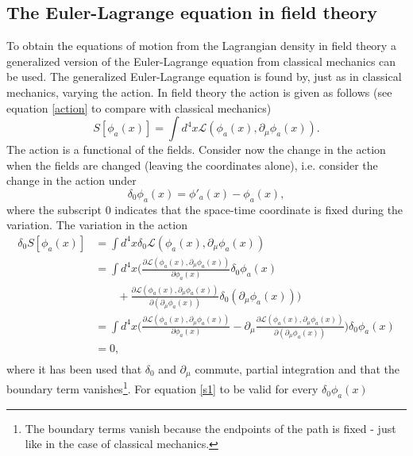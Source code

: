\subsection{The Euler-Lagrange equation in field theory}
To obtain the equations of motion from the Lagrangian density in field theory a generalized version of the Euler-Lagrange equation from classical mechanics can be used. The generalized Euler-Lagrange equation is found by, just as in classical mechanics, varying the action. In field theory the action is given as follows (see equation \eqref{action} to compare with classical mechanics) 
\begin{equation}
	S[\phi_a(x)]=\int d^4x\mathcal{L}(\phi_a(x),\partial_\mu\phi_a(x)).
\end{equation} 
The action is a functional of the fields. Consider now the change in the action when the fields are changed (leaving the coordinates alone), i.e. consider the change in the action under
\begin{equation}
	\delta_0 \phi_a(x)=\phi'_a(x)-\phi_a(x),
\end{equation} 
where the subscript $0$ indicates that the space-time coordinate is fixed during the variation. The variation in the action
\begin{equation}
	\begin{split}
		\delta_0 S[\phi_a(x)]&=\int d^4x\delta_0\mathcal{L}(\phi_a(x),\partial_\mu\phi_a(x))\\
		&=\int d^4x\bigg(\frac{\partial \mathcal{L}(\phi_a(x),\partial_\mu\phi_a(x))}{\partial \phi_a(x)}\delta_0 \phi_a(x)\\
		& \qquad+\frac{\partial \mathcal{L}(\phi_a(x),\partial_\mu\phi_a(x))}{\partial (\partial_\mu\phi_a(x))}\delta_0 (\partial_\mu\phi_a(x))\bigg)\\
		&=\int d^4x\bigg(\frac{\partial \mathcal{L}(\phi_a(x),\partial_\mu\phi_a(x))}{\partial \phi_a(x)}-\partial_\mu \frac{\partial \mathcal{L}(\phi_a(x),\partial_\mu\phi_a(x))}{\partial (\partial_\mu\phi_a(x))}\bigg)\delta_0 \phi_a(x)\\
		&=0,\\
	\end{split}
	\label{s1}
\end{equation} 
where it has been used that $\delta_0$ and $\partial_\mu$ commute, partial integration and that the boundary term vanishes\footnote{The boundary terms vanish because the endpoints of the path is fixed - just like in the case of classical mechanics.}. For equation \eqref{s1} to be valid for every $\delta_0 \phi_a(x)$
